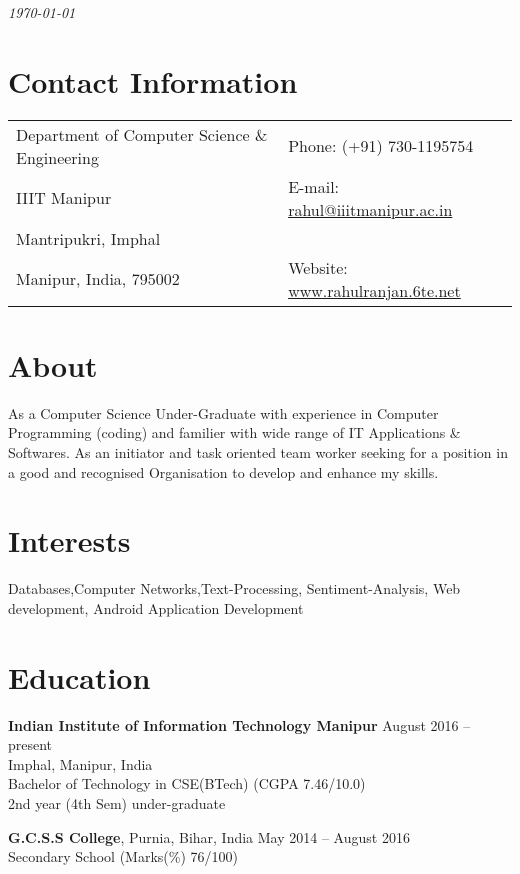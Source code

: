 \documentclass[margin,line]{res}
\begin{document}
 \hfill {\em \today}

\begin{resume}
\section{\sc Contact Information}

\vspace{.05in}
\begin{tabular}{@{}p{3.5in}p{3in}}
Department of Computer Science \& Engineering             & {Phone:}  (+91) 730-1195754 \\
IIIT Manipur 
 & {E-mail:}   \href{mailto:rahul@iiitmanipur.ac.in}{rahul@iiitmanipur.ac.in}\\
Mantripukri, Imphal\\
Manipur, India, 795002  & {Website:} \url{www.rahulranjan.6te.net}
\end{tabular}
\section{\sc About}
As a Computer Science Under-Graduate with experience in Computer Programming (coding) and familier with wide range of IT
Applications \& Softwares. As an initiator and task oriented team worker seeking for a position in a good and recognised Organisation to
develop and enhance my skills. 

\section{\sc Interests}

Databases,Computer Networks,Text-Processing, Sentiment-Analysis, Web development, Android Application Development

\section{\sc Education}
{\bf Indian Institute of Information Technology Manipur} \hfill August 2016 -- present\\
Imphal, Manipur, India
\\Bachelor of Technology in CSE(BTech) \hfill(CGPA 7.46/10.0) \\2nd year (4th Sem) under-graduate 

{\bf G.C.S.S College}, Purnia, Bihar, India \hfill 
May 2014 -- August 2016\\
Secondary School \hfill(Marks(\%) 76/100)


\end{resume}
\end{document}

